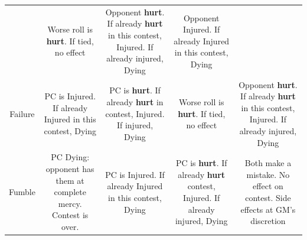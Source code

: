 \documentclass[
]{article}
\begin{document}
\begin{longtable}[]{@{}ccccc@{}}
\begin{minipage}[t]{0.19\columnwidth}
\end{minipage} & \begin{minipage}[t]{0.19\columnwidth}\centering
Worse roll is \textbf{hurt}. If tied, no effect\strut
\end{minipage} & \begin{minipage}[t]{0.19\columnwidth}\centering
Opponent \textbf{hurt}. If already \textbf{hurt} in this contest,
Injured. If already injured, Dying\strut
\end{minipage} & \begin{minipage}[t]{0.19\columnwidth}\centering
Opponent Injured. If already Injured in this contest, Dying\strut
\end{minipage}\tabularnewline
\begin{minipage}[t]{0.11\columnwidth}\centering
Failure\strut
\end{minipage} & \begin{minipage}[t]{0.19\columnwidth}\centering
PC is Injured. If already Injured in this contest, Dying\strut
\end{minipage} & \begin{minipage}[t]{0.19\columnwidth}\centering
PC is \textbf{hurt}. If already \textbf{hurt} in contest, Injured. If
injured, Dying\strut
\end{minipage} & \begin{minipage}[t]{0.19\columnwidth}\centering
Worse roll is \textbf{hurt}. If tied, no effect\strut
\end{minipage} & \begin{minipage}[t]{0.19\columnwidth}\centering
Opponent \textbf{hurt}. If already \textbf{hurt} in this contest,
Injured. If already injured, Dying\strut
\end{minipage}\tabularnewline
\begin{minipage}[t]{0.11\columnwidth}\centering
Fumble\strut
\end{minipage} & \begin{minipage}[t]{0.19\columnwidth}\centering
PC Dying: opponent has them at complete mercy. Contest is over.\strut
\end{minipage} & \begin{minipage}[t]{0.19\columnwidth}\centering
PC is Injured. If already Injured in this contest, Dying\strut
\end{minipage} & \begin{minipage}[t]{0.19\columnwidth}\centering
PC is \textbf{hurt}. If already \textbf{hurt} contest, Injured. If
already injured, Dying\strut
\end{minipage} & \begin{minipage}[t]{0.19\columnwidth}\centering
Both make a mistake. No effect on contest. Side effects at GM's
discretion\strut
\end{minipage}\tabularnewline
\bottomrule
\end{longtable}
\end{document}

